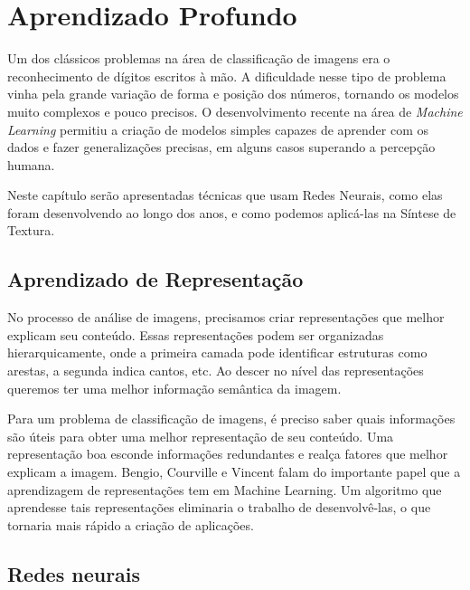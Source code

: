 \chapter{Aprendizado Profundo}


Um dos clássicos problemas na área
de classificação de imagens era o
reconhecimento de dígitos
escritos à mão. 
A dificuldade nesse tipo de problema
vinha pela grande variação de forma
e posição dos números, tornando 
os modelos muito complexos e pouco
precisos. O desenvolvimento
recente na área de \textit{Machine Learning}
permitiu a criação de modelos
simples capazes de aprender com
os dados e fazer generalizações
precisas, em alguns casos
superando a percepção humana.

Neste capítulo serão apresentadas
técnicas que usam Redes Neurais,
como elas foram desenvolvendo
ao longo dos anos, e como podemos
aplicá-las na Síntese de Textura.



\section{Aprendizado de Representação}


No processo de análise de imagens,
precisamos criar representações
que melhor explicam seu conteúdo.
Essas representações podem ser organizadas
hierarquicamente, onde
a primeira camada pode identificar estruturas como
arestas, a segunda indica cantos, etc.
Ao descer no nível das representações
queremos ter uma melhor informação
semântica da imagem.


Para um problema de classificação de imagens,
é preciso saber quais informações são 
úteis para obter uma melhor 
representação de seu conteúdo. 
Uma representação boa esconde informações
redundantes e realça fatores que 
melhor explicam a imagem.
Bengio, Courville e Vincent
\cite{Bengio2014} falam do importante
papel que a aprendizagem
de representações tem em Machine Learning.
Um algoritmo que aprendesse tais representações
eliminaria o trabalho de desenvolvê-las,
o que tornaria mais rápido a criação de aplicações.


\section{Redes neurais}



